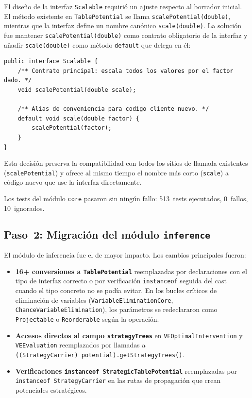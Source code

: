 \documentclass[11pt,a4paper]{article}
\newcommand{\code}[1]{\texttt{#1}}
\begin{document}
El diseño de la interfaz \code{Scalable} requirió un ajuste respecto al
borrador inicial.  El método existente en \code{TablePotential} se llama
\code{scalePotential(double)}, mientras que la interfaz define un nombre
canónico \code{scale(double)}.  La solución fue mantener
\code{scalePotential(double)} como contrato obligatorio de la interfaz y
añadir \code{scale(double)} como método \code{default} que delega en él:

\begin{lstlisting}[caption={Delegación \emph{default} en la interfaz \code{Scalable}}]
public interface Scalable {
    /** Contrato principal: escala todos los valores por el factor dado. */
    void scalePotential(double scale);

    /** Alias de conveniencia para codigo cliente nuevo. */
    default void scale(double factor) {
        scalePotential(factor);
    }
}
\end{lstlisting}

Esta decisión preserva la compatibilidad con todos los sitios de llamada
existentes (\code{scalePotential}) y ofrece al mismo tiempo el nombre
más corto (\code{scale}) a código nuevo que use la interfaz directamente.

Los tests del módulo \code{core} pasaron sin ningún fallo: 513~tests
ejecutados, 0~fallos, 10~ignorados.

\subsection{Paso~2: Migración del módulo \code{inference}}
\label{sec:impl-paso2}

El módulo de inferencia fue el de mayor impacto.  Los cambios principales
fueron:

\begin{itemize}
  \item \textbf{16+ conversiones a \code{TablePotential}} reemplazadas por
        declaraciones con el tipo de interfaz correcto o por verificación
        \code{instanceof} seguida del cast cuando el tipo concreto no se
        podía evitar.  En los bucles críticos de eliminación de
        variables (\code{VariableEliminationCore},
        \code{ChanceVariableElimination}), los parámetros se redeclararon
        como \code{Projectable} o \code{Reorderable} según la operación.

  \item \textbf{Accesos directos al campo \code{strategyTrees}} en
        \code{VEOptimalIntervention} y \code{VEEvaluation} reemplazados por
        llamadas a \code{((StrategyCarrier)~potential).getStrategyTrees()}.

  \item \textbf{Verificaciones \code{instanceof StrategicTablePotential}}
        reemplazadas por \code{instanceof StrategyCarrier} en las rutas de
        propagación que crean potenciales estratégicos.
\end{itemize}
\end{document}
